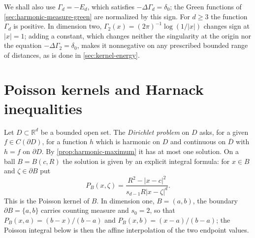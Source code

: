 We shall also use $\Gamma_d=-E_d$, which satisfies $-\Delta\Gamma_d=\delta_0$; the Green functions of \cref{sec:harmonic-measure-green} are normalized by this sign. For $d\geq3$ the function $\Gamma_d$ is positive. In dimension two, $\Gamma_2(x)=(2\pi)^{-1}\log(1/|x|)$ changes sign at $|x|=1$; adding a constant, which changes neither the singularity at the origin nor the equation $-\Delta\Gamma_2=\delta_0$, makes it nonnegative on any prescribed bounded range of distances, as is done in \cref{sec:kernel-energy}.

\section{Poisson kernels and Harnack inequalities}
\label{sec:poisson-kernels}
Let $D\subset\mathbb R^d$ be a bounded open set. The \emph{Dirichlet problem} on $D$ asks, for a given $f\in C(\partial D)$, for a function $h$ which is harmonic on $D$ and continuous on $\overline D$ with $h=f$ on $\partial D$. By \cref{prop:harmonic-maximum} it has at most one solution. On a ball $B=B(c,R)$ the solution is given by an explicit integral formula: for $x\in B$ and $\zeta\in\partial B$ put
\begin{equation}\label{eq:ball-poisson-kernel}
 P_B(x,\zeta)=\frac{R^2-|x-c|^2}{s_{d-1}R|x-\zeta|^d}.
\end{equation}
This is the Poisson kernel of $B$. In dimension one, $B=(a,b)$, the boundary $\partial B=\{a,b\}$ carries counting measure and $s_0=2$, so that $P_B(x,a)=(b-x)/(b-a)$ and $P_B(x,b)=(x-a)/(b-a)$; the Poisson integral below is then the affine interpolation of the two endpoint values.

